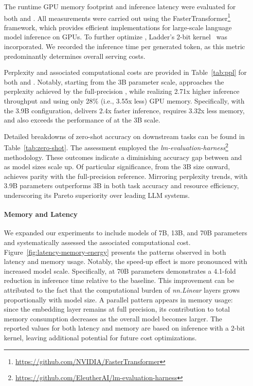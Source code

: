 The runtime GPU memory footprint and inference latency were evaluated for both  and . All measurements were carried out using the FasterTransformer\footnote{\url{https://github.com/NVIDIA/FasterTransformer}} framework, which provides efficient implementations for large-scale language model inference on GPUs. To further optimize , Ladder’s 2-bit kernel~\cite{ladder} was incorporated. We recorded the inference time per generated token, as this metric predominantly determines overall serving costs.

Perplexity and associated computational costs are provided in Table~\ref{tab:ppl} for both  and . Notably, starting from the 3B parameter scale,  approaches the perplexity achieved by the full-precision , while realizing 2.71x higher inference throughput and using only 28\% (i.e., 3.55x less) GPU memory. Specifically, with the 3.9B configuration,  delivers 2.4x faster inference, requires 3.32x less memory, and also exceeds the performance of  at the 3B scale.

Detailed breakdowns of zero-shot accuracy on downstream tasks can be found in Table~\ref{tab:zero-shot}. The assessment employed the \emph{lm-evaluation-harness}\footnote{\url{https://github.com/EleutherAI/lm-evaluation-harness}} methodology. These outcomes indicate a diminishing accuracy gap between  and  as model sizes scale up. Of particular significance, from the 3B size onward,  achieves parity with the full-precision reference. Mirroring perplexity trends,  with 3.9B parameters outperforms  3B in both task accuracy and resource efficiency, underscoring its Pareto superiority over leading LLM systems.

\paragraph{Memory and Latency}

We expanded our experiments to include models of 7B, 13B, and 70B parameters and systematically assessed the associated computational cost. Figure~\ref{fig:latency-memory-energy} presents the patterns observed in both latency and memory usage. Notably, the speed-up effect is more pronounced with increased model scale. Specifically,  at 70B parameters demonstrates a 4.1-fold reduction in inference time relative to the  baseline. This improvement can be attributed to the fact that the computational burden of \emph{nn.Linear} layers grows proportionally with model size. A parallel pattern appears in memory usage: since the embedding layer remains at full precision, its contribution to total memory consumption decreases as the overall model becomes larger. The reported values for both latency and memory are based on inference with a 2-bit kernel, leaving additional potential for future cost optimizations.

